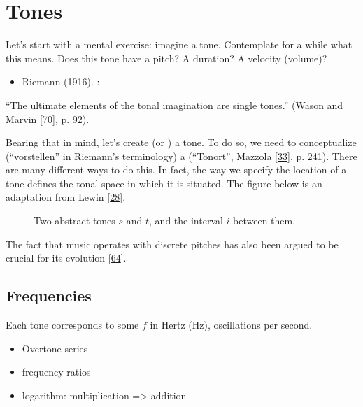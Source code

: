 \documentclass[letterpaper,10pt,english]{sphinxmanual}
\begin{document}
\section{Tones}
\label{\detokenize{1_fundamentals:tones}}
\sphinxAtStartPar
Let’s start with a mental exercise: imagine a tone.
Contemplate for a while what this means.
Does this tone have a pitch? A duration? A velocity (volume)?
\begin{itemize}
\item {} 
\sphinxAtStartPar
Riemann (1916). :

\end{itemize}

\sphinxAtStartPar
“The ultimate elements of the tonal imagination are single tones.”
(Wason and Marvin {[}\hyperlink{cite.8_bibliography:id19}{70}{]}, p. 92).

\sphinxAtStartPar
Bearing that in mind, let’s create (or )
a tone. To do so, we need to
conceptualize (“vorstellen” in Riemann’s terminology)
a  (“Tonort”, Mazzola {[}\hyperlink{cite.8_bibliography:id49}{33}{]}, p. 241).
There are many different ways to do this.
In fact, the way we specify the location of a tone
defines the tonal space in which it is situated.
The figure below is an adaptation from Lewin {[}\hyperlink{cite.8_bibliography:id2}{28}{]}.
\begin{figure}[htbp]\centering\capstart{}\caption{Two abstract tones \(s\) and \(t\), and the interval \(i\) between them.}\label{\detokenize{1_fundamentals:id8}}\end{figure}
\sphinxAtStartPar
The fact that music operates with discrete pitches
has also been argued to be crucial for its
evolution {[}\hyperlink{cite.8_bibliography:id52}{64}{]}.


\subsection{Frequencies}
\label{\detokenize{1_fundamentals:frequencies}}
\sphinxAtStartPar
Each tone corresponds to some  \(f\) in Hertz (Hz),
oscillations per second.
\begin{itemize}
\item {} 
\sphinxAtStartPar
Overtone series

\item {} 
\sphinxAtStartPar
frequency ratios

\item {} 
\sphinxAtStartPar
logarithm: multiplication =\textgreater{} addition

\end{itemize}
\end{document}
